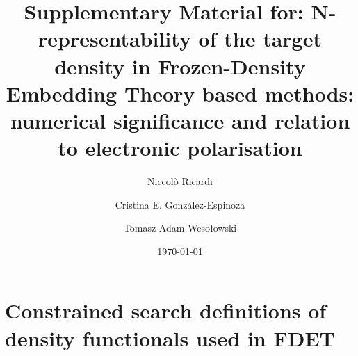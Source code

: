 \documentclass[amsmath,amssymb,preprint,aip,jcp]{revtex4-1}
\begin{document}
\author{Niccol\`{o} Ricardi}
\author{Cristina E. Gonz\'{a}lez-Espinoza}
\author{Tomasz Adam Weso\l{}owski}
% 
\date{\today}
\title{Supplementary Material for: {\color{red}
N-representability of the target density in Frozen-Density Embedding Theory based methods: numerical significance and relation to electronic polarisation}
}

\maketitle
\section{Constrained search definitions of density functionals used in FDET}
\end{document}
